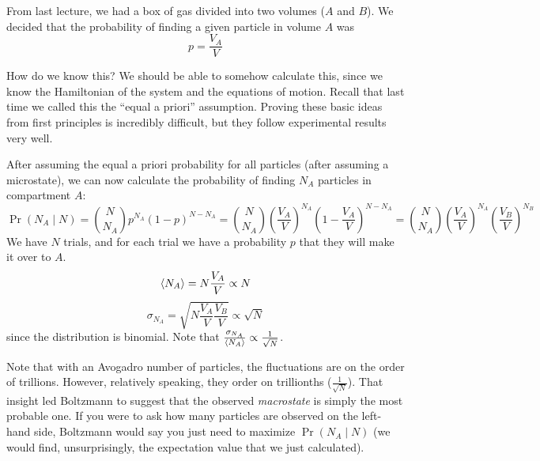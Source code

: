 \documentclass[a4paper,twoside,master.tex]{subfiles}
\begin{document}

From last lecture, we had a box of gas divided into two volumes ($ A $ and $ B $). We decided that the probability of finding a given particle in volume $ A $ was
\begin{equation}
    p = \frac{V_A}{V}
\end{equation}

How do we know this? We should be able to somehow calculate this, since we know the Hamiltonian of the system and the equations of motion. Recall that last time we called this the ``equal a priori'' assumption. Proving these basic ideas from first principles is incredibly difficult, but they follow experimental results very well.

After assuming the equal a priori probability for all particles (after assuming a microstate), we can now calculate the probability of finding $ N_A $ particles in compartment $ A $:
\begin{equation}
    \Pr(N_A\mid N) = \binom{N}{N_A} p^{N_A} (1-p)^{N-N_A} = \binom{N}{N_A} \left( \frac{V_A}{V} \right)^{N_A} \left( 1 - \frac{V_A}{V} \right)^{N - N_A} = \binom{N}{N_A} \left(\frac{ V_A}{V} \right)^{N_A} \left(\frac{ V_B}{V} \right)^{N_B}
\end{equation}
We have $ N $ trials, and for each trial we have a probability $ p $ that they will make it over to $ A $.
\begin{equation}
    \ev{N_A} = N \frac{V_A}{V} \propto N
\end{equation}
\begin{equation}
    \sigma_{N_A} = \sqrt{N \frac{V_A}{V} \frac{V_B}{V}} \propto \sqrt{N}
\end{equation}
since the distribution is binomial. Note that $ \frac{\sigma_{N_A}}{\ev{N_A}} \propto \frac{1}{\sqrt{N}} $.

Note that with an Avogadro number of particles, the fluctuations are on the order of trillions. However, relatively speaking, they order on trillionths ($\frac{ 1}{\sqrt{N}} $). That insight led Boltzmann to suggest that the observed \textit{macrostate} is simply the most probable one. If you were to ask how many particles are observed on the left-hand side, Boltzmann would say you just need to maximize $ \Pr(N_A\mid N) $ (we would find, unsurprisingly, the expectation value that we just calculated).
\end{document}
